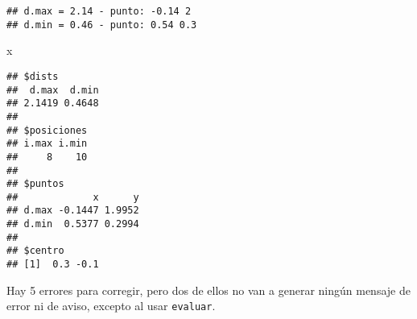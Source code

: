 \documentclass[]{article}
\newenvironment{Shaded}{}{}
\newcommand{\NormalTok}[1]{{#1}}
\begin{document}
\begin{verbatim}
## d.max = 2.14 - punto: -0.14 2 
## d.min = 0.46 - punto: 0.54 0.3
\end{verbatim}
\begin{Shaded}
\begin{Highlighting}[]
\NormalTok{x}
\end{Highlighting}
\end{Shaded}
\begin{verbatim}
## $dists
##  d.max  d.min 
## 2.1419 0.4648 
## 
## $posiciones
## i.max i.min 
##     8    10 
## 
## $puntos
##             x      y
## d.max -0.1447 1.9952
## d.min  0.5377 0.2994
## 
## $centro
## [1]  0.3 -0.1
\end{verbatim}
Hay 5 errores para corregir, pero dos de ellos no van a generar ningún
mensaje de error ni de aviso, excepto al usar \texttt{evaluar}.
\end{document}
